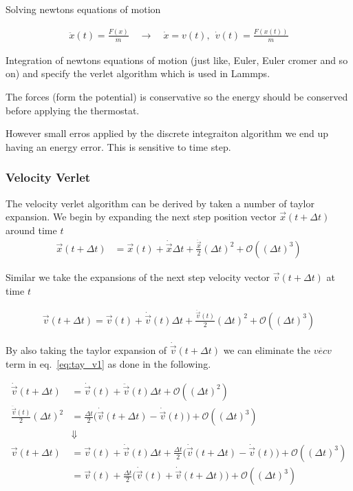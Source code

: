 Solving newtons equations of motion 

\begin{align*}
  \ddot{x}(t) = \frac{F(x)}{m} \quad \rightarrow \quad 
  \dot{x} = v(t), \ \ \dot{v}(t) = \frac{F(x(t))}{m}
\end{align*}

Integration of newtons equations of motion (just like, Euler, Euler cromer and so on) and specify the verlet algorithm which is used in Lammps.

The forces (form the potential) is conservative so the energy should be conserved before applying the thermostat.

However small erros applied by the discrete integraiton algorithm we end up having an energy error. This is sensitive to time step. 


\subsubsection{Velocity Verlet}
The velocity verlet algorithm can be derived by taken a number of taylor expansion. We begin by expanding the next step position vector $\vec{x}(t + \Delta t)$ around time $t$
\begin{align}
  \vec{x}(t + \Delta t) &= \vec{x}(t) + \dot{\vec{x}} \Delta t + \frac{\ddot{\vec{x}}}{2} (\Delta t)^2 + \mathcal{O}((\Delta t)^3) \label{eq:vv_comp1} 
\end{align}

Similar we take the expansions of the next step velocity vector $\vec{v}(t+\Delta t)$ at time $t$ 

\begin{align}
  \vec{v}(t+\Delta t) = \vec{v}(t) + \dot{\vec{v}}(t) \Delta t + \frac{\ddot{\vec{v}}(t)}{2}(\Delta t)^2 + \mathcal{O}((\Delta t)^3)
  \label{eq:tay_v1}
\end{align}

By also taking the taylor expansion of $\dot{\vec{v}}(t+\Delta t)$ we can eliminate the $\ddot{vec{v}}$ term in eq.~\eqref{eq:tay_v1} as done in the following.

\begin{align}
  \dot{\vec{v}}(t+\Delta t) &= \dot{\vec{v}}(t) + \ddot{\vec{v}}(t) \Delta t + \mathcal{O}((\Delta t)^2) \nonumber \\
  \frac{\ddot{\vec{v}}(t)}{2}(\Delta t)^2 &= \frac{\Delta t}{2}\Big( \dot{\vec{v}}(t+\Delta t) - \dot{\vec{v}}(t)\Big) + \mathcal{O}((\Delta t)^3) \nonumber \\
  &\Downarrow \nonumber \\
  \vec{v}(t+\Delta t) &= \vec{v}(t) + \dot{\vec{v}}(t) \Delta t + \frac{\Delta t}{2}\Big( \dot{\vec{v}}(t+\Delta t) - \dot{\vec{v}}(t)\Big) + \mathcal{O}((\Delta t)^3) \nonumber \\
  &=  \vec{v}(t) + \frac{\Delta t}{2}\Big( \dot{\vec{v}}(t) +  \dot{\vec{v}}(t+\Delta t)\Big) + \mathcal{O}((\Delta t)^3)
  \label{eq:vv_comp2}
\end{align}

